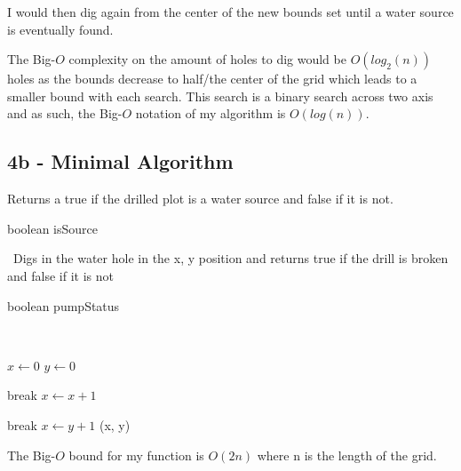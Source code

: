 \documentclass[oneside, a4paper]{article}
\begin{document}
I would then dig again from the center of the new bounds set until a water source is eventually found.

The Big-$O$ complexity on the amount of holes to dig would be $O(log_2(n))$ holes as the bounds decrease to half/the center of the grid which leads to a smaller bound with each search. This search is a binary search across two axis and as such, the Big-$O$ notation of my algorithm is $O(log(n))$. 

\subsection{4b - Minimal Algorithm}

Returns a true if the drilled plot is a water source and false if it is not.
\begin{algorithmic}[1]
        \State \Return boolean isSource
    \EndFunction
\end{algorithmic}
\
Digs in the water hole in the x, y position and returns true if the drill is broken and false if it is not
\begin{algorithmic}[1]
        \State \Return boolean pumpStatus
    \EndFunction
\end{algorithmic}

\
\begin{algorithmic}[1]
    \State $x \gets 0$
    \State $y \gets 0$
    
            \State break
        \Else \State $x \gets x + 1$
        \EndIf
    \EndWhile
    
            \State break
        \Else \State $x \gets y + 1$
        \EndIf
    \EndWhile
    \State \Return (x, y)
    \EndFunction
\end{algorithmic}

The Big-$O$ bound for my function is $O(2n)$ where n is the length of the grid.
\end{document}
